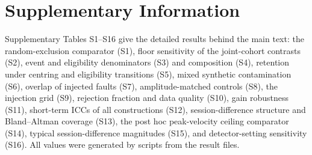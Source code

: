 \section*{Supplementary Information}
\setcounter{table}{0}
\renewcommand{\thetable}{S\arabic{table}}
Supplementary Tables S1--S16 give the detailed results behind the main text: the random-exclusion comparator (S1), floor sensitivity of the joint-cohort contrasts (S2), event and eligibility denominators (S3) and composition (S4), retention under centring and eligibility transitions (S5), mixed synthetic contamination (S6), overlap of injected faults (S7), amplitude-matched controls (S8), the injection grid (S9), rejection fraction and data quality (S10), gain robustness (S11), short-term ICCs of all constructions (S12), session-difference structure and Bland--Altman coverage (S13), the post hoc peak-velocity ceiling comparator (S14), typical session-difference magnitudes (S15), and detector-setting sensitivity (S16). All values were generated by scripts from the result files.


